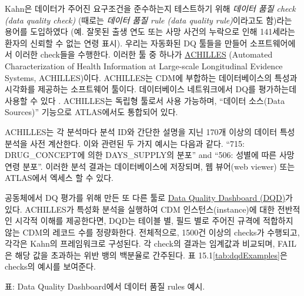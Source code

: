 \documentclass[11pt]{book}
\theoremstyle{definition}
\theoremstyle{definition}
\theoremstyle{definition}
\theoremstyle{remark}
\begin{document}
Kahn은 데이터가 주어진 요구조건을 준수하는지 테스트하기 위해
\emph{데이터 품질 check (data quality check)} (때로는 \emph{데이터 품질
rule (data quality rule)}이라고도 함)라는 용어를 도입하였다 (예. 잘못된
출생 연도 또는 사망 사건의 누락으로 인해 141세라는 환자의 신뢰할 수 없는
연령 표시). 우리는 자동화된 DQ 툴들을 만들어 소프트웨어에서 이러한
check들을 수행한다. 이러한 툴 중 하나가
\href{https://github.com/OHDSI/Achilles}{ACHILLES} (Automated
Characterization of Health Information at Large-scale Longitudinal
Evidence Systems, ACHILLES)이다. \citep{huser_methods_2018} ACHILLES는
CDM에 부합하는 데이터베이스의 특성과 시각화를 제공하는 소프트웨어
툴이다. 데이터베이스 네트워크에서 DQ를 평가하는데 사용할 수 있다
\citep{huser_multisite_2016}. ACHILLES는 독립형 툴로서 사용 가능하며,
``데이터 소스(Data Sources)'' 기능으로 ATLAS에서도 통합되어 있다.
 

ACHILLES는 각 분석마다 분석 ID와 간단한 설명을 지닌 170개 이상의 데이터
특성 분석을 사전 계산한다. 이와 관련된 두 가지 예시는 다음과 같다.
``715: DRUG\_CONCEPT에 의한 DAYS\_SUPPLY의 분포'' and ``506: 성별에 따른
사망 연령 분포''. 이러한 분석 결과는 데이터베이스에 저장되며, 웹
뷰어(web viewer) 또는 ATLAS에서 엑세스 할 수 있다.


공동체에서 DQ 평가를 위해 만든 또 다른 툴로
\href{https://github.com/OHDSI/DataQualityDashboard}{Data Quality
Dashboard (DQD)}가 있다. ACHILLES가 특성화 분석을 실행하여 CDM
인스턴스(instance)에 대한 전반적인 시각적 이해를 제공한다면, DQD는
테이블 별, 필드 별로 주어진 규격에 적합하지 않는 CDM의 레코드 수를
정량화한다. 전체적으로, 1500건 이상의 checks가 수행되고, 각각은 Kahn의
프레임워크로 구성된다. 각 check의 결과는 임계값과 비교되며, FAIL은 해당
값을 초과하는 위반 뱅의 백분율로 간주된다. 표
15.1\ref{tab:dqdExamples}은 checks의 예시를 보여준다.

표: \label{tab:dqdExamples} Data Quality Dashboard에서 데이터 품질 rules
예시.
\end{document}

